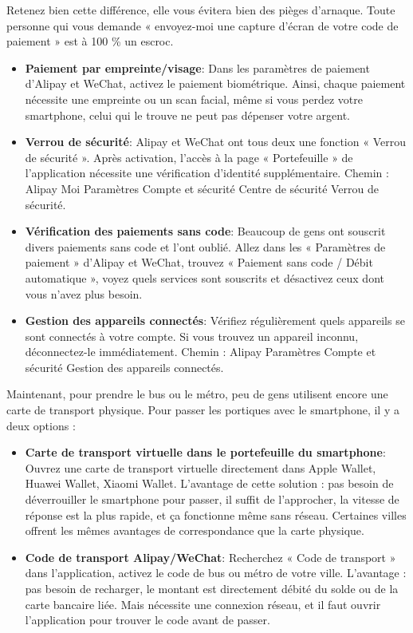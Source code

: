 Retenez bien cette différence, elle vous évitera bien des pièges d'arnaque. Toute personne qui vous demande « envoyez-moi une capture d'écran de votre code de paiement » est à 100 \% un escroc.


\begin{itemize}
  \item \textbf{Paiement par empreinte/visage}: Dans les paramètres de paiement d'Alipay et WeChat, activez le paiement biométrique. Ainsi, chaque paiement nécessite une empreinte ou un scan facial, même si vous perdez votre smartphone, celui qui le trouve ne peut pas dépenser votre argent.
  \item \textbf{Verrou de sécurité}: Alipay et WeChat ont tous deux une fonction « Verrou de sécurité ». Après activation, l'accès à la page « Portefeuille » de l'application nécessite une vérification d'identité supplémentaire. Chemin : Alipay Moi Paramètres Compte et sécurité Centre de sécurité Verrou de sécurité.
  \item \textbf{Vérification des paiements sans code}: Beaucoup de gens ont souscrit divers paiements sans code et l'ont oublié. Allez dans les « Paramètres de paiement » d'Alipay et WeChat, trouvez « Paiement sans code / Débit automatique », voyez quels services sont souscrits et désactivez ceux dont vous n'avez plus besoin.
  \item \textbf{Gestion des appareils connectés}: Vérifiez régulièrement quels appareils se sont connectés à votre compte. Si vous trouvez un appareil inconnu, déconnectez-le immédiatement. Chemin : Alipay Paramètres Compte et sécurité Gestion des appareils connectés.
\end{itemize}


Maintenant, pour prendre le bus ou le métro, peu de gens utilisent encore une carte de transport physique. Pour passer les portiques avec le smartphone, il y a deux options :

\begin{itemize}
  \item \textbf{Carte de transport virtuelle dans le portefeuille du smartphone}: Ouvrez une carte de transport virtuelle directement dans Apple Wallet, Huawei Wallet, Xiaomi Wallet. L'avantage de cette solution : pas besoin de déverrouiller le smartphone pour passer, il suffit de l'approcher, la vitesse de réponse est la plus rapide, et ça fonctionne même sans réseau. Certaines villes offrent les mêmes avantages de correspondance que la carte physique.
  \item \textbf{Code de transport Alipay/WeChat}: Recherchez « Code de transport » dans l'application, activez le code de bus ou métro de votre ville. L'avantage : pas besoin de recharger, le montant est directement débité du solde ou de la carte bancaire liée. Mais nécessite une connexion réseau, et il faut ouvrir l'application pour trouver le code avant de passer.
\end{itemize}


